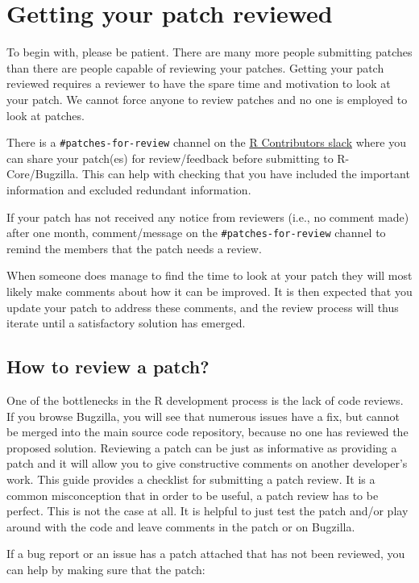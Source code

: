 \documentclass[
]{book}
\begin{document}
\section{Getting your patch reviewed}\label{PatchesReview}

To begin with, please be patient. There are many more people submitting patches than there are people capable of reviewing your patches. Getting your patch reviewed requires a reviewer to have the spare time and motivation to look at your patch. We cannot force anyone to review patches and no one is employed to look at patches.

There is a \texttt{\#patches-for-review} channel on the \href{https://r-contributors.slack.com/}{R Contributors slack} where you can share your patch(es) for review/feedback before submitting to R-Core/Bugzilla. This can help with checking that you have included the important information and excluded redundant information.

If your patch has not received any notice from reviewers (i.e., no comment made) after one month, comment/message on the \texttt{\#patches-for-review} channel to remind the members that the patch needs a review.

When someone does manage to find the time to look at your patch they will most likely make comments about how it can be improved. It is then expected that you update your patch to address these comments, and the review process will thus iterate until a satisfactory solution has emerged.

\subsection{How to review a patch?}\label{how-to-review-a-patch}

One of the bottlenecks in the R development process is the lack of code reviews. If you browse Bugzilla, you will see that numerous issues have a fix, but cannot be merged into the main source code repository, because no one has reviewed the proposed solution. Reviewing a patch can be just as informative as providing a patch and it will allow you to give constructive comments on another developer's work. This guide provides a checklist for submitting a patch review. It is a common misconception that in order to be useful, a patch review has to be perfect. This is not the case at all. It is helpful to just test the patch and/or play around with the code and leave comments in the patch or on Bugzilla.

If a bug report or an issue has a patch attached that has not been reviewed, you can help by making sure that the patch:
\end{document}
